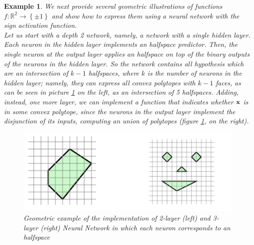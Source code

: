 \documentclass[12pt]{report}
\theoremstyle{plain}
\newtheorem{example}{Example}[chapter]
\begin{document}
\begin{flushleft}
\begin{example}
	We next provide several geometric illustrations of functions $f:\mathds{R}^2\to\left\{\pm 1\right\}$ and show how to express them using a neural network with the sign activation function.\\
	Let us start with a depth 2 network, namely, a network with a single hidden layer. Each neuron in the hidden layer implements an halfspace predictor. Then, the single neuron at the output layer applies an halfspace on top of the binary outputs of the neurons in the hidden layer. So the network contains all hypothesis which are an intersection of $k-1$ halfspaces, where $k$ is the number of neurons in the hidden layer; namely, they can express all convex polytopes with $k-1$ faces, as can be seen in picture \ref{fig:NN_ex_geom} on the left, as an intersection of 5 halfspaces. Adding, instead, one more layer, we can implement a function that indicates whether $\vb{x}$ is in some convex polytope, since the neurons in the output layer implement the disjunction of its inputs, computing an union of polytopes (figure \ref{fig:NN_ex_geom}, on the right).
	\begin{figure}[!h]
		\centering
		\includegraphics[scale=0.6]{images/NN_ex_geom.pdf}
		\caption{Geometric example of the implementation of 2-layer (left) and 3-layer (right) Neural Network in which each neuron corresponds to an halfspace}
		\label{fig:NN_ex_geom}
	\end{figure}
\end{example}


\end{flushleft}
\end{document}
